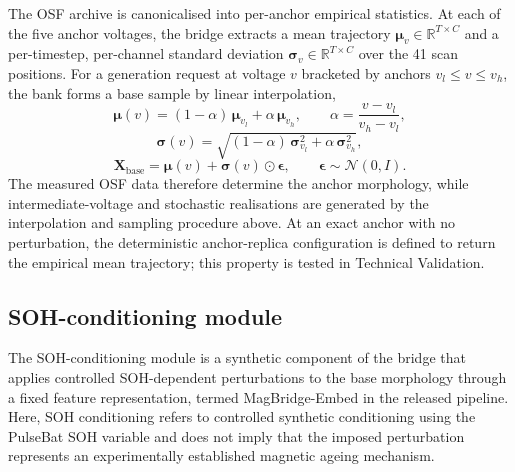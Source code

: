 \documentclass[11pt]{article}
\begin{document}
The OSF archive is canonicalised into per-anchor empirical statistics. At each of the five anchor voltages, the bridge extracts a mean trajectory $\boldsymbol{\mu}_v \in \mathbb{R}^{T \times C}$ and a per-timestep, per-channel standard deviation $\boldsymbol{\sigma}_v \in \mathbb{R}^{T \times C}$ over the 41 scan positions. For a generation request at voltage $v$ bracketed by anchors $v_l \leq v \leq v_h$, the bank forms a base sample by linear interpolation,
\begin{equation}
\boldsymbol{\mu}(v) = (1-\alpha)\,\boldsymbol{\mu}_{v_l} + \alpha\,\boldsymbol{\mu}_{v_h}, \qquad \alpha = \frac{v - v_l}{v_h - v_l},
\end{equation}
\begin{equation}
\boldsymbol{\sigma}(v) = \sqrt{(1-\alpha)\,\boldsymbol{\sigma}_{v_l}^2 + \alpha\,\boldsymbol{\sigma}_{v_h}^2},
\end{equation}
\begin{equation}
\mathbf{X}_{\mathrm{base}} = \boldsymbol{\mu}(v) + \boldsymbol{\sigma}(v) \odot \boldsymbol{\epsilon}, \qquad \boldsymbol{\epsilon} \sim \mathcal{N}(0, I).
\end{equation}
The measured OSF data therefore determine the anchor morphology, while intermediate-voltage and stochastic realisations are generated by the interpolation and sampling procedure above. At an exact anchor with no perturbation, the deterministic anchor-replica
configuration is defined to return the empirical mean trajectory; this
property is tested in Technical Validation.

\subsection*{SOH-conditioning module}

The SOH-conditioning module is a synthetic component of the bridge that applies controlled SOH-dependent perturbations to the base morphology through a fixed feature representation, termed MagBridge-Embed in the released pipeline. Here, SOH conditioning refers to controlled synthetic conditioning using the PulseBat SOH variable and does not imply that the imposed perturbation represents an experimentally established magnetic ageing mechanism.
\end{document}
